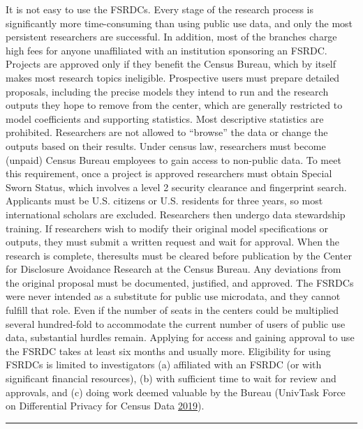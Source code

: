 \documentclass[]{krantz}
\begin{document}
It is not easy to use the FSRDCs. Every stage of the research process is
significantly more time-consuming than using public use data, and only
the most persistent researchers are successful. In addition, most of the
branches charge high fees for anyone unaffiliated with an institution
sponsoring an FSRDC. Projects are approved only if they benefit the
Census Bureau, which by itself makes most research topics ineligible.
Prospective users must prepare detailed proposals, including the precise
models they intend to run and the research outputs they hope to remove
from the center, which are generally restricted to model coefficients
and supporting statistics. Most descriptive statistics are prohibited.
Researchers are not allowed to ``browse'' the data or change the outputs
based on their results. Under census law, researchers must become
(unpaid) Census Bureau employees to gain access to non-public data. To
meet this requirement, once a project is approved researchers must
obtain Special Sworn Status, which involves a level 2 security clearance
and fingerprint search. Applicants must be U.S. citizens or U.S.
residents for three years, so most international scholars are excluded.
Researchers then undergo data stewardship training. If researchers wish
to modify their original model specifications or outputs, they must
submit a written request and wait for approval. When the research is
complete, theresults must be cleared before publication by the Center
for Disclosure Avoidance Research at the Census Bureau. Any deviations
from the original proposal must be documented, justified, and approved.
The FSRDCs were never intended as a substitute for public use microdata,
and they cannot fulfill that role. Even if the number of seats in the
centers could be multiplied several hundred-fold to accommodate the
current number of users of public use data, substantial hurdles remain.
Applying for access and gaining approval to use the FSRDC takes at least
six months and usually more. Eligibility for using FSRDCs is limited to
investigators (a) affiliated with an FSRDC (or with significant
financial resources), (b) with sufficient time to wait for review and
approvals, and (c) doing work deemed valuable by the Bureau (UnivTask
Force on Differential Privacy for Census Data
\protect\hyperlink{ref-UnivTaskForceonDifferentialPrivacyforCensusData2019}{2019}).

\begin{center}\rule{0.5\linewidth}{\linethickness}\end{center}
\end{document}
